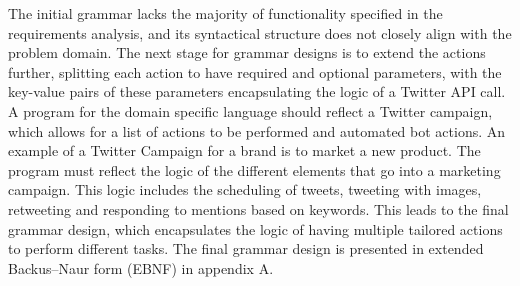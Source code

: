 The initial grammar lacks the majority of functionality specified in the requirements analysis, and its syntactical structure does not closely align with the problem domain. The next stage for grammar designs is to extend the actions further, splitting each action to have required and optional parameters, with the key-value pairs of these parameters encapsulating the logic of a Twitter API call. A program for the domain specific language should reflect a Twitter campaign, which allows for a list of actions to be performed and automated bot actions. An example of a Twitter Campaign for a brand is to market a new product. The program must reflect the logic of the different elements that go into a marketing campaign. This logic includes the scheduling of tweets, tweeting with images, retweeting and responding to mentions based on keywords. This leads to the final grammar design, which encapsulates the logic of having multiple tailored actions to perform different tasks. The final grammar design is presented in extended Backus–Naur form (EBNF) in appendix A.